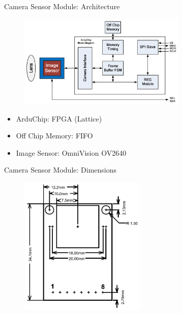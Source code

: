 
\begin{frame}{Camera Sensor Module: Architecture}

    \begin{figure}[!ht]
        \begin{center}
            \includegraphics[width=8cm]{figures/arducam-block-diagram}
        \end{center}
    \end{figure}        
    
    \begin{itemize}
        \item ArduChip: FPGA (Lattice)
        \item Off Chip Memory: FIFO
        \item Image Sensor: OmniVision OV2640
    \end{itemize}
                        
\end{frame}             
 

\begin{frame}{Camera Sensor Module: Dimensions}

    \begin{figure}[!ht]
        \begin{center}
            \includegraphics[width=6cm]{figures/arducam-dimensions}
        \end{center}
    \end{figure}        
    
\end{frame}             

